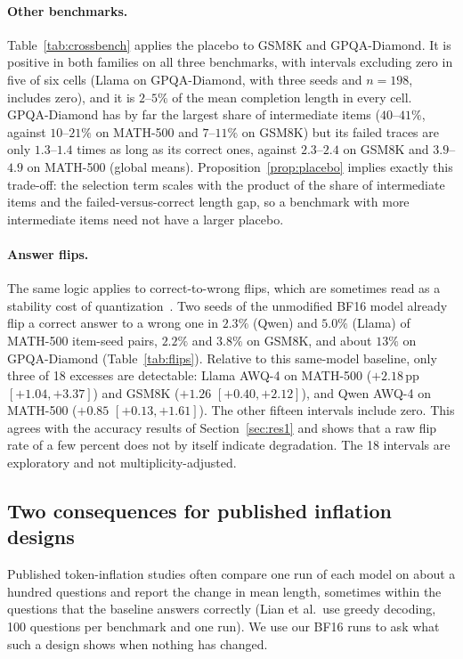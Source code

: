 \documentclass[11pt,a4paper]{article}
\begin{document}
\paragraph{Other benchmarks.} Table~\ref{tab:crossbench} applies the placebo to GSM8K and GPQA-Diamond. It is positive in both families on all three benchmarks, with intervals excluding zero in five of six cells (Llama on GPQA-Diamond, with three seeds and $n=198$, includes zero), and it is $2$--$5\%$ of the mean completion length in every cell. GPQA-Diamond has by far the largest share of intermediate items ($40$--$41\%$, against $10$--$21\%$ on MATH-500 and $7$--$11\%$ on GSM8K) but its failed traces are only $1.3$--$1.4$ times as long as its correct ones, against $2.3$--$2.4$ on GSM8K and $3.9$--$4.9$ on MATH-500 (global means). Proposition~\ref{prop:placebo} implies exactly this trade-off: the selection term scales with the product of the share of intermediate items and the failed-versus-correct length gap, so a benchmark with more intermediate items need not have a larger placebo.



\paragraph{Answer flips.} The same logic applies to correct-to-wrong flips, which are sometimes read as a stability cost of quantization~\cite{hiddeninstability2025}. Two seeds of the unmodified BF16 model already flip a correct answer to a wrong one in $2.3\%$ (Qwen) and $5.0\%$ (Llama) of MATH-500 item-seed pairs, $2.2\%$ and $3.8\%$ on GSM8K, and about $13\%$ on GPQA-Diamond (Table~\ref{tab:flips}). Relative to this same-model baseline, only three of 18 excesses are detectable: Llama AWQ-4 on MATH-500 ($+2.18$\,pp $[+1.04,+3.37]$) and GSM8K ($+1.26$ $[+0.40,+2.12]$), and Qwen AWQ-4 on MATH-500 ($+0.85$ $[+0.13,+1.61]$). The other fifteen intervals include zero. This agrees with the accuracy results of Section~\ref{sec:res1} and shows that a raw flip rate of a few percent does not by itself indicate degradation. The 18 intervals are exploratory and not multiplicity-adjusted.



\subsection{Two consequences for published inflation designs}
\label{sec:designs}
Published token-inflation studies often compare one run of each model on about a hundred questions and report the change in mean length, sometimes within the questions that the baseline answers correctly (Lian et al.\ use greedy decoding, 100 questions per benchmark and one run). We use our BF16 runs to ask what such a design shows when nothing has changed.
\end{document}
